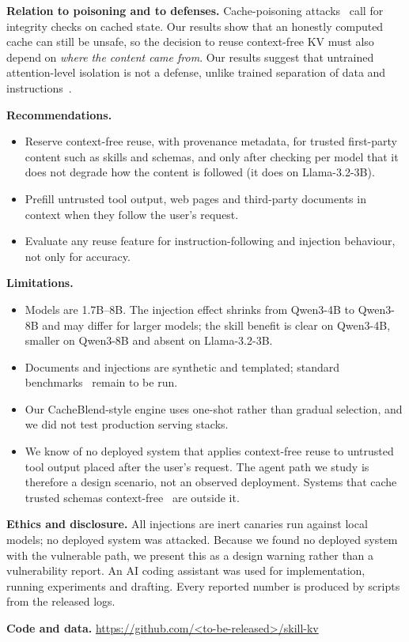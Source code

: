 \documentclass[10pt]{article}
\newcommand{\coderelease}{\url{https://github.com/<to-be-released>/skill-kv}}
\begin{document}
\textbf{Relation to poisoning and to defenses.} Cache-poisoning attacks~\citep{zhang2026hijackkv,zhu2026r2ecap} call for integrity
checks on cached state. Our results show that an honestly computed cache can still be unsafe, so the decision to reuse context-free
KV must also depend on \emph{where the content came from}. Our results suggest that untrained attention-level isolation is not a defense, unlike trained
separation of data and instructions~\citep{chen2025struq,chen2025secalign}.

\textbf{Recommendations.}
\begin{itemize}\itemsep0pt
\item Reserve context-free reuse, with provenance metadata, for trusted first-party content such as skills and schemas, and only
  after checking per model that it does not degrade how the content is followed (it does on Llama-3.2-3B).
\item Prefill untrusted tool output, web pages and third-party documents in context when they follow the user's request.
\item Evaluate any reuse feature for instruction-following and injection behaviour, not only for accuracy.
\end{itemize}

\textbf{Limitations.}
\begin{itemize}\itemsep0pt
\item Models are 1.7B--8B. The injection effect shrinks from Qwen3-4B to Qwen3-8B and may differ for larger models; the skill
  benefit is clear on Qwen3-4B, smaller on Qwen3-8B and absent on Llama-3.2-3B.
\item Documents and injections are synthetic and templated; standard benchmarks~\citep{zhan2024injecagent,debenedetti2024agentdojo,yi2025bipia}
  remain to be run.
\item Our CacheBlend-style engine uses one-shot rather than gradual selection, and we did not test production serving stacks.
\item We know of no deployed system that applies context-free reuse to untrusted tool output placed after the user's request. The
  agent path we study is therefore a design scenario, not an observed deployment. Systems that cache trusted schemas
  context-free~\citep{fang2026recache} are outside it.
\end{itemize}

\textbf{Ethics and disclosure.} All injections are inert canaries run against local models; no deployed system was attacked. Because we
found no deployed system with the vulnerable path, we present this as a design warning rather than a vulnerability report. An AI coding
assistant was used for implementation, running experiments and drafting. Every reported number is produced by scripts from the
released logs.

\textbf{Code and data.} \coderelease



\end{document}
